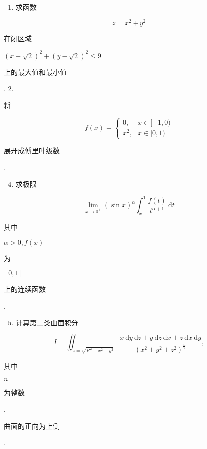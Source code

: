 \documentclass[10pt]{article}
\begin{document}
\begin{enumerate}
  \item \begin{CJK}{UTF8}{mj}求函数\end{CJK}
\end{enumerate}
$$
z=x^{2}+y^{2}
$$
\begin{CJK}{UTF8}{mj}在闭区域\end{CJK} $(x-\sqrt{2})^{2}+(y-\sqrt{2})^{2} \leqslant 9$ \begin{CJK}{UTF8}{mj}上的最大值和最小值\end{CJK}. 2. \begin{CJK}{UTF8}{mj}将\end{CJK}
$$
f(x)= \begin{cases}0, & x \in[-1,0) \\ x^{2}, & x \in[0,1)\end{cases}
$$
\begin{CJK}{UTF8}{mj}展开成傅里叶级数\end{CJK}.

\begin{enumerate}
  \setcounter{enumi}{3}
  \item \begin{CJK}{UTF8}{mj}求极限\end{CJK}
\end{enumerate}
$$
\lim _{x \rightarrow 0^{+}}(\sin x)^{\alpha} \int_{x}^{1} \frac{f(t)}{t^{\alpha+1}} \mathrm{~d} t
$$
\begin{CJK}{UTF8}{mj}其中\end{CJK} $\alpha>0, f(x)$ \begin{CJK}{UTF8}{mj}为\end{CJK} $[0,1]$ \begin{CJK}{UTF8}{mj}上的连续函数\end{CJK}.

\begin{enumerate}
  \setcounter{enumi}{4}
  \item \begin{CJK}{UTF8}{mj}计算第二类曲面积分\end{CJK}
\end{enumerate}
$$
I=\iint_{z=\sqrt{R^{2}-x^{2}-y^{2}}} \frac{x \mathrm{~d} y \mathrm{~d} z+y \mathrm{~d} z \mathrm{~d} x+z \mathrm{~d} x \mathrm{~d} y}{\left(x^{2}+y^{2}+z^{2}\right)^{\frac{n}{2}}},
$$
\begin{CJK}{UTF8}{mj}其中\end{CJK} $n$ \begin{CJK}{UTF8}{mj}为整数\end{CJK}, \begin{CJK}{UTF8}{mj}曲面的正向为上侧\end{CJK}.
\end{document}
